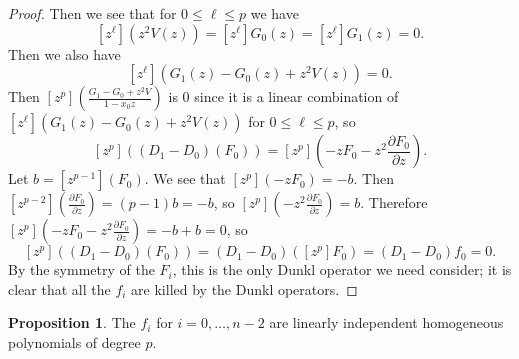 \documentclass{amsart}
\numberwithin{equation}{section}
\theoremstyle{definition}
\newtheorem{proposition}[equation]{Proposition}
\begin{document}
\begin{proof}
Then we see that for $0 \le \ell \le p$ we have
\[
[z^\ell](z^2V(z))=[z^\ell]G_0(z)=[z^\ell]G_1(z)=0.
\]
Then we also have
\[
[z^\ell](G_1(z)-G_0(z)+z^2V(z))=0.
\]
Then $[z^p]\left(\frac{G_1-G_0+z^2V}{1-x_0z}\right)$ is $0$ since it is a linear combination of $[z^\ell](G_1(z)-G_0(z)+z^2V(z))$ for $0 \le \ell \le p$, so 
\[
[z^p]\left((D_1-D_0)(F_0)\right)=[z^p]\left(-zF_0-z^2\frac{\partial F_0}{\partial z}\right).
\]
Let $b=[z^{p-1}](F_0)$. We see that $[z^p](-zF_0)=-b$. Then $[z^{p-2}]\left(\frac{\partial F_0}{\partial z}\right)=(p-1)b=-b$, so $[z^p]\left(-z^2\frac{\partial F_0}{\partial z}\right)=b$. Therefore $[z^p]\left(-zF_0-z^2\frac{\partial F_0}{\partial z}\right)=-b+b=0$, so 
\[
[z^p]((D_1-D_0)(F_0))=(D_1-D_0)([z^p]F_0)=(D_1-D_0)f_0=0.
\]
By the symmetry of the $F_i$, this is the only Dunkl operator we need consider; it is clear that all the $f_i$ are killed by the Dunkl operators.
\end{proof}

\begin{proposition}\label{prop:linind} The $f_i$ for $i=0,\dots,n-2$ are linearly independent homogeneous polynomials of degree $p$.
\end{proposition} 
\end{document}
